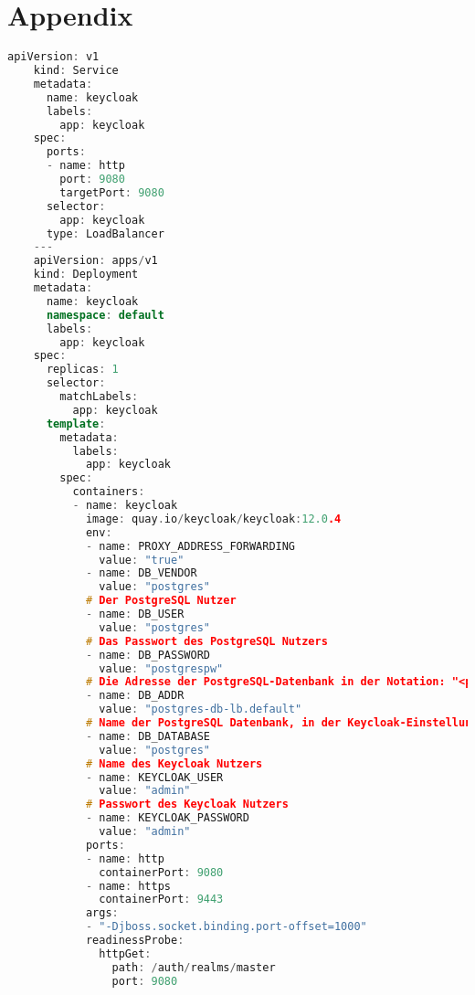 \chapter{Appendix}
\label{Appendix}

\begin{lstlisting}[language=C++,frame=tb,caption={Deployment und Service von Keycloak},label=lst:DeploymentundServicevonKeycloak]
    apiVersion: v1
    kind: Service
    metadata:
      name: keycloak
      labels:
        app: keycloak
    spec:
      ports:
      - name: http
        port: 9080
        targetPort: 9080
      selector:
        app: keycloak
      type: LoadBalancer
    ---
    apiVersion: apps/v1
    kind: Deployment
    metadata:
      name: keycloak
      namespace: default
      labels:
        app: keycloak
    spec:
      replicas: 1
      selector:
        matchLabels:
          app: keycloak
      template:
        metadata:
          labels:
            app: keycloak
        spec:
          containers:
          - name: keycloak
            image: quay.io/keycloak/keycloak:12.0.4
            env:
            - name: PROXY_ADDRESS_FORWARDING
              value: "true"
            - name: DB_VENDOR
              value: "postgres"
            # Der PostgreSQL Nutzer
            - name: DB_USER
              value: "postgres"
            # Das Passwort des PostgreSQL Nutzers
            - name: DB_PASSWORD
              value: "postgrespw"
            # Die Adresse der PostgreSQL-Datenbank in der Notation: "<postgres-service-name>"."<namespace>"
            - name: DB_ADDR
              value: "postgres-db-lb.default"
            # Name der PostgreSQL Datenbank, in der Keycloak-Einstellungen gespeichert werden
            - name: DB_DATABASE
              value: "postgres"
            # Name des Keycloak Nutzers
            - name: KEYCLOAK_USER
              value: "admin"
            # Passwort des Keycloak Nutzers
            - name: KEYCLOAK_PASSWORD
              value: "admin"
            ports:
            - name: http
              containerPort: 9080
            - name: https
              containerPort: 9443
            args:
            - "-Djboss.socket.binding.port-offset=1000"
            readinessProbe:
              httpGet:
                path: /auth/realms/master
                port: 9080    
  \end{lstlisting}
  \bigskip


